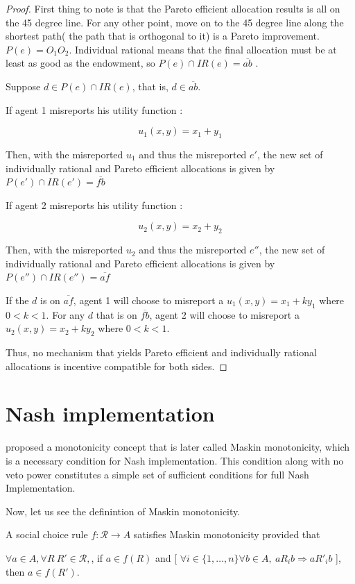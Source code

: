 \begin{proof}
First thing to note is that the Pareto efficient allocation results is
all 
on the 45 degree line. For any other point, move on to the 45 degree
line along the shortest path( the path that is orthogonal to it) is a
Pareto improvement. $P(e)=O_1O_2$.  
Individual rational means that the final allocation must be at least
as good as the endowment, so $P(e) \cap IR(e) = \overline{ab}$ .

Suppose $d \in P(e) \cap IR(e)$, that is, $d \in \overline{ab}$.

If agent 1 misreports his utility function :

$$ u_1(x,y)=x_1 + y_1$$

Then, with the misreported $u_1$ and thus the misreported $e'$, the new set of individually rational and Pareto efficient allocations is given
by $P(e') \cap IR(e') = \overline{fb}$


If agent 2 misreports his utility function :

$$ u_2(x,y)=x_2 + y_2$$

Then, with the misreported $u_2$ and thus the misreported $e''$, the new set of individually rational and Pareto efficient allocations is given
by $P(e'') \cap IR(e'') = \overline{af}$

 If the $d$ is on $\overline{af}$, agent 1 will choose to
misreport a $u_1(x,y)=x_1 + ky_1$ where $0<k<1$. For any $d$ that is on $\overline{fb}$, agent 2 will choose to
misreport a $u_2(x,y)=x_2 + ky_2$ where $0<k<1$. 

Thus, no mechanism that yields Pareto efficient and individually rational allocations is
incentive compatible for both sides.


\end{proof}

\section{Nash implementation}
\parencite{Maskin1999} proposed a monotonicity concept that is later
called Maskin monotonicity, which is a necessary condition for Nash implementation. This condition along with no veto power
constitutes a simple set of  sufficient conditions 
for full Nash Implementation. 

Now, let us see the definintion of Maskin monotonicity.

\begin{definition}
A social choice rule $f: \mathscr{R} \rightarrow A$ satisfies Maskin
monotonicity provided that

$\forall a \in A, \forall R\ R' \in \mathscr{R},$, if $a \in f(R)$ and [
$\forall i \in \{1, \dots, n\} \forall b \in A  ,\  aR_i b \Rightarrow
aR'_i b$ ], then $ a \in f(R')$.
\end{definition}

